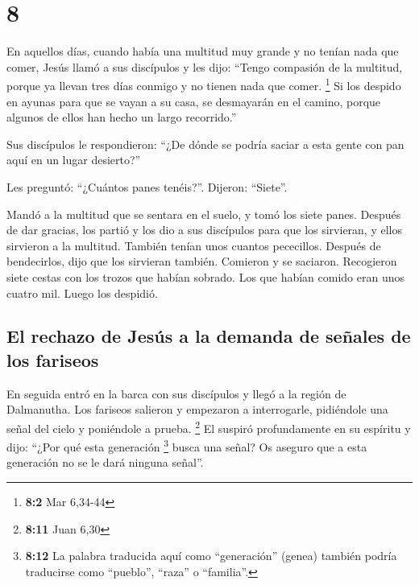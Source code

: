 \hypertarget{section-7}{%
\section{8}\label{section-7}}

 En aquellos días, cuando había una multitud muy grande y
no tenían nada que comer, Jesús llamó a sus discípulos y les dijo:
 ``Tengo compasión de la multitud, porque ya llevan tres
días conmigo y no tienen nada que comer. \footnote{\textbf{8:2} Mar
  6,34-44}  Si los despido en ayunas para que se vayan a
su casa, se desmayarán en el camino, porque algunos de ellos han hecho
un largo recorrido.''

 Sus discípulos le respondieron: ``¿De dónde se podría
saciar a esta gente con pan aquí en un lugar desierto?''

 Les preguntó: ``¿Cuántos panes tenéis?''. Dijeron:
``Siete''.

 Mandó a la multitud que se sentara en el suelo, y tomó
los siete panes. Después de dar gracias, los partió y los dio a sus
discípulos para que los sirvieran, y ellos sirvieron a la multitud.
 También tenían unos cuantos pececillos. Después de
bendecirlos, dijo que los sirvieran también.  Comieron y
se saciaron. Recogieron siete cestas con los trozos que habían sobrado.
 Los que habían comido eran unos cuatro mil. Luego los
despidió.

\hypertarget{el-rechazo-de-jesuxfas-a-la-demanda-de-seuxf1ales-de-los-fariseos}{%
\subsection{El rechazo de Jesús a la demanda de señales de los
fariseos}\label{el-rechazo-de-jesuxfas-a-la-demanda-de-seuxf1ales-de-los-fariseos}}

 En seguida entró en la barca con sus discípulos y llegó
a la región de Dalmanutha.  Los fariseos salieron y
empezaron a interrogarle, pidiéndole una señal del cielo y poniéndole a
prueba. \footnote{\textbf{8:11} Juan 6,30}  El suspiró
profundamente en su espíritu y dijo: ``¿Por qué esta generación
\footnote{\textbf{8:12} La palabra traducida aquí como ``generación''
  (genea) también podría traducirse como ``pueblo'', ``raza'' o
  ``familia''.} busca una señal? Os aseguro que a esta generación no se
le dará ninguna señal''.

